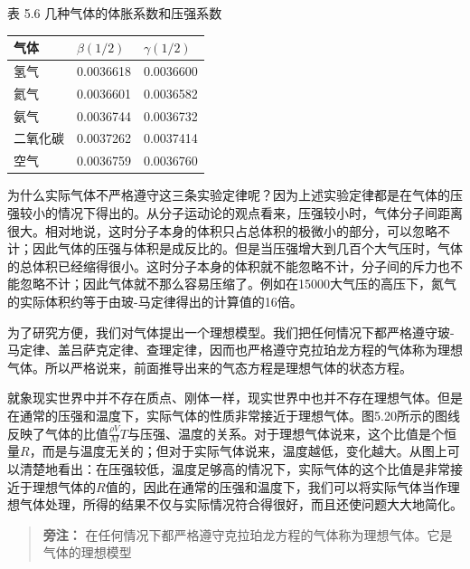 表 5.6 几种气体的体胀系数和压强系数

{\def\LTcaptype{none} %
\begin{longtable}[]{@{}lll@{}}
\toprule\noalign{}
气体 & \(\beta(1/2)\) & \(\gamma(1/2)\) \\
\midrule\noalign{}
\endhead
\bottomrule\noalign{}
\endlastfoot
氢气 & 0.0036618 & 0.0036600 \\
氦气 & 0.0036601 & 0.0036582 \\
氨气 & 0.0036744 & 0.0036732 \\
二氧化碳 & 0.0037262 & 0.0037414 \\
空气 & 0.0036759 & 0.0036760 \\
\end{longtable}
}

为什么实际气体不严格遵守这三条实验定律呢？因为上述实验定律都是在气体的压强较小的情况下得出的。从分子运动论的观点看来，压强较小时，气体分子间距离很大。相对地说，这时分子本身的体积只占总体积的极微小的部分，可以忽略不计；因此气体的压强与体积是成反比的。但是当压强增大到几百个大气压时，气体的总体积已经缩得很小。这时分子本身的体积就不能忽略不计，分子间的斥力也不能忽略不计；因此气体就不那么容易压缩了。例如在15000大气压的高压下，氮气的实际体积约等于由玻-马定律得出的计算值的16倍。

为了研究方便，我们对气体提出一个理想模型。我们把任何情况下都严格遵守玻-马定律、盖吕萨克定律、查理定律，因而也严格遵守克拉珀龙方程的气体称为理想气体。所以严格说来，前面推导出来的气态方程是理想气体的状态方程。

就象现实世界中并不存在质点、刚体一样，现实世界中也并不存在理想气体。但是在通常的压强和温度下，实际气体的性质非常接近于理想气体。图5.20所示的图线反映了气体的比值\(\frac{\rho V}{M} T\)与压强、温度的关系。对于理想气体说来，这个比值是个恒量\(R\)，而是与温度无关的；但对于实际气体说来，温度越低，变化越大。从图上可以清楚地看出：在压强较低，温度足够高的情况下，实际气体的这个比值是非常接近于理想气体的\(R\)值的，因此在通常的压强和温度下，我们可以将实际气体当作理想气体处理，所得的结果不仅与实际情况符合得很好，而且还使问题大大地简化。

\begin{quote}
\textbf{旁注：}
在任何情况下都严格遵守克拉珀龙方程的气体称为理想气体。它是气体的理想模型
\end{quote}

